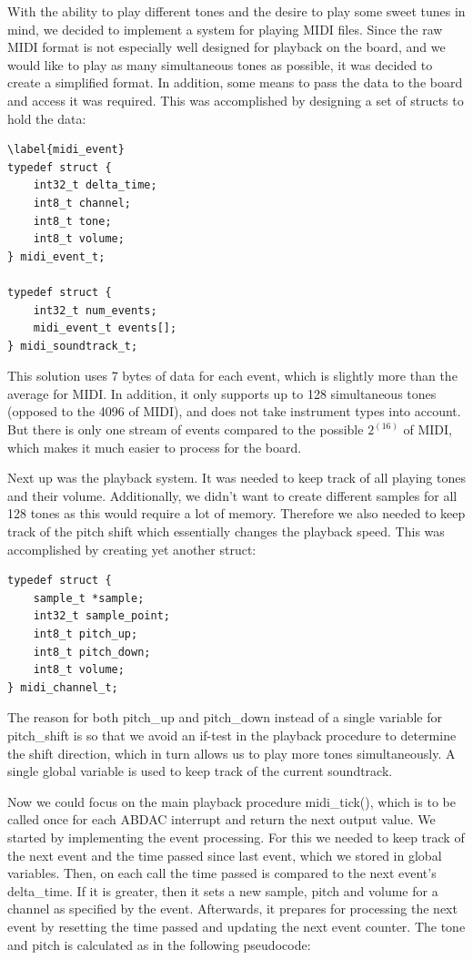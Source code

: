 \documentclass[a4paper,12pt]{article}
\begin{document}
With the ability to play different tones and the desire to play some sweet tunes in mind, we decided to implement a system for playing MIDI files. Since the raw MIDI format is not especially well designed for playback on the board, and we would like to play as many simultaneous tones as possible, it was decided to create a simplified format. In addition, some means to pass the data to the board and access it was required. This was accomplished by designing a set of structs to hold the data:

\begin{verbatim}\label{midi_event}
typedef struct {
    int32_t delta_time;
    int8_t channel;
    int8_t tone;
    int8_t volume;
} midi_event_t;

typedef struct {
    int32_t num_events;
    midi_event_t events[];
} midi_soundtrack_t;
\end{verbatim}

This solution uses 7 bytes of data for each event, which is slightly more than the average for MIDI. In addition, it only supports up to 128 simultaneous tones (opposed to the 4096 of MIDI), and does not take instrument types into account. But there is only one stream of events compared to the possible $2^(16)$ of MIDI, which makes it much easier to process for the board.

Next up was the playback system. It was needed to keep track of all playing tones and their volume. Additionally, we didn’t want to create different samples for all 128 tones as this would require a lot of memory. Therefore we also needed to keep track of the pitch shift which essentially changes the playback speed. This was accomplished by creating yet another struct:

\begin{verbatim}
typedef struct {
    sample_t *sample;
    int32_t sample_point;
    int8_t pitch_up;
    int8_t pitch_down;
    int8_t volume;
} midi_channel_t;
\end{verbatim}

The reason for both pitch\_up and pitch\_down instead of a single variable for pitch\_shift is so that we avoid an if-test in the playback procedure to determine the shift direction, which in turn allows us to play more tones simultaneously. A single global variable is used to keep track of the current soundtrack.

Now we could focus on the main playback procedure midi\_tick(), which is to be called once for each ABDAC interrupt and return the next output value. We started by implementing the event processing. For this we needed to keep track of the next event and the time passed since last event, which we stored in global variables. Then, on each call the time passed is compared to the next event’s delta\_time. If it is greater, then it sets a new sample, pitch and volume for a channel as specified by the event. Afterwards, it prepares for processing the next event by resetting the time passed and updating the next event counter. The tone and pitch is calculated as in the following pseudocode:
\end{document}
